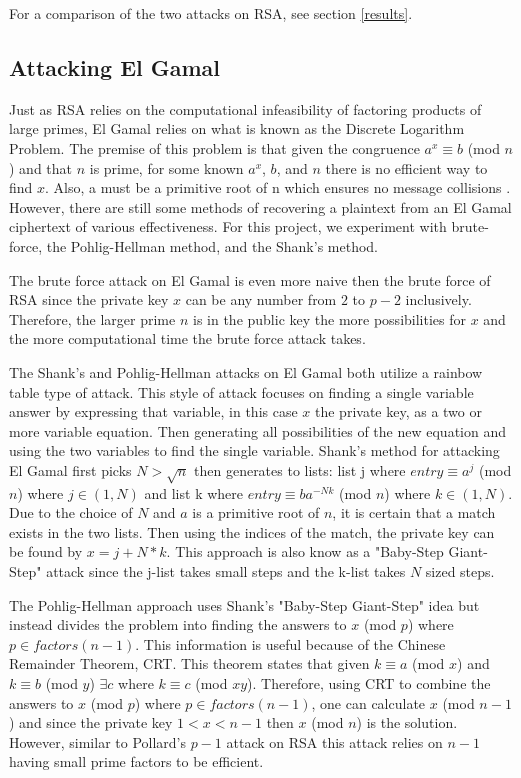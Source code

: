 \documentclass[12pt]{report}
\begin{document}
For a comparison of the two attacks on RSA, see section \ref{results}.

\subsection{Attacking El Gamal}
Just as RSA relies on the computational infeasibility of factoring products of large primes, El Gamal relies on what is known as the Discrete Logarithm Problem. The premise of this problem is that given the congruence $a^{x} \equiv b$ (mod $n$) and that $n$ is prime, for some known $a^{x}$, $b$, and $n$ there is no efficient way to find $x$. Also, a must be a primitive root of n which ensures no message collisions \cite{root}. However, there are still some methods of recovering a plaintext from an El Gamal ciphertext of various effectiveness. For this project, we experiment with brute-force, the Pohlig-Hellman method, and the Shank's method.

The brute force attack on El Gamal is even more naive then the brute force of RSA since the private key $x$ can be any number from $2$ to $p-2$ inclusively. Therefore, the larger prime $n$ is in the public key the more possibilities for $x$ and the more computational time the brute force attack takes.

The Shank's and Pohlig-Hellman attacks on El Gamal both utilize a rainbow table type of attack. This style of attack focuses on finding a single variable answer by expressing that variable, in this case $x$ the private key, as a two or more variable equation. Then generating all possibilities of the new equation and using the two variables to find the single variable. Shank's method for attacking El Gamal first picks $N > \sqrt{n}$ then generates to lists: list j where $entry \equiv a^{j}$ (mod $n$) where $j \in (1,N)$ and list k where $entry \equiv ba^{-Nk}$ (mod $n$) where $k \in (1,N)$. Due to the choice of $N$ and $a$ is a primitive root of $n$, it is certain that a match exists in the two lists. Then using the indices of the match, the private key can be found by $x = j + N*k$. This approach is also know as a "Baby-Step Giant-Step" attack since the j-list takes small steps and the k-list takes $N$ sized steps.

The Pohlig-Hellman approach uses Shank's "Baby-Step Giant-Step" idea but instead divides the problem into finding the answers to $x$ (mod $p$) where $p \in factors(n-1)$. This information is useful because of the Chinese Remainder Theorem, CRT. This theorem states that given $k \equiv a$ (mod $x$) and $k \equiv b$ (mod $y$) $\exists c$ where $k \equiv c$ (mod $xy$). Therefore, using CRT to combine the answers to $x$ (mod $p$) where $p \in factors(n-1)$, one can calculate $x$ (mod $n-1$) and since the private key $1 < x < n-1$ then $x$ (mod $n$) is the solution. However, similar to Pollard's $p-1$ attack on RSA this attack relies on $n-1$ having small prime factors to be efficient.
\end{document}

